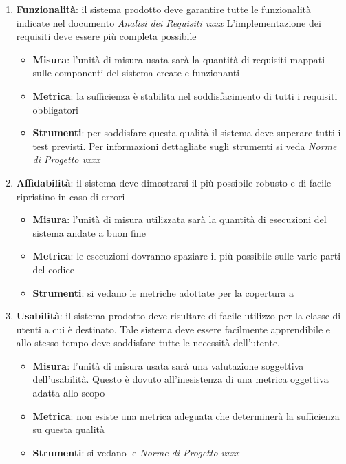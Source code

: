 {\begin{enumerate}
  \item \textbf{Funzionalità}: il sistema prodotto deve garantire tutte
  le funzionalità indicate nel documento \emph{Analisi dei Requisiti
  vxxx} L'implementazione dei requisiti deve essere più completa
  possibile
  
  \begin{itemize}
    \item \textbf{Misura}: l’unità di misura usata sarà la quantità di requisiti mappati sulle componenti del sistema create e funzionanti
    \item \textbf{Metrica}: la sufficienza è stabilita nel soddisfacimento di tutti i requisiti obbligatori
    \item \textbf{Strumenti}: per soddisfare questa qualità il sistema deve superare tutti i test previsti.
    Per informazioni dettagliate sugli strumenti si veda  \emph{Norme di Progetto vxxx} 
  \end{itemize}
  
  \item \textbf{Affidabilità}: il sistema deve dimostrarsi il più possibile robusto e di facile ripristino in caso di errori
  
  \begin{itemize}
    \item \textbf{Misura}: l’unità di misura utilizzata sarà la quantità di esecuzioni del sistema andate a buon fine
    \item \textbf{Metrica}: le esecuzioni dovranno spaziare il più
    possibile sulle varie parti del codice
    \item \textbf{Strumenti}: si vedano le metriche adottate per la
    copertura a %
  \end{itemize}
  
  \item \textbf{Usabilità}: il sistema prodotto deve risultare di facile
  utilizzo per la classe di utenti a cui è destinato. Tale sistema
  deve essere facilmente apprendibile e allo stesso tempo deve
  soddisfare tutte le necessità dell’utente. 
  \begin{itemize}
    \item \textbf{Misura}: l’unità di misura usata sarà una valutazione soggettiva dell’usabilità. Questo è dovuto all’inesistenza di una metrica oggettiva adatta allo scopo
    \item \textbf{Metrica}:  non esiste una metrica adeguata che determinerà la sufficienza su questa qualità
    \item \textbf{Strumenti}: si vedano le  \emph{Norme di Progetto vxxx} 
  \end{itemize}
  

\end{enumerate}}
